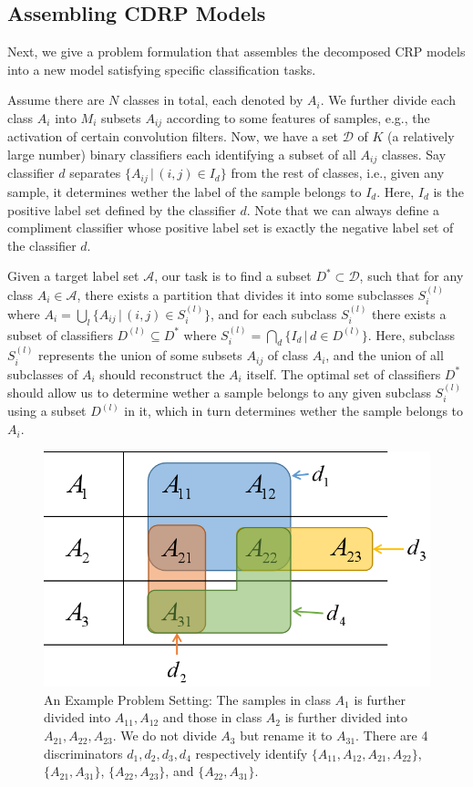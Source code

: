 \documentclass[acmsmall,nonacm]{acmart}\settopmatter{}
\begin{document}
\subsection{Assembling CDRP Models}
Next, we give a problem formulation that assembles the decomposed CRP models into a new model satisfying specific classification tasks.

Assume there are $N$ classes in total, each denoted by $A_i$.
We further divide each class $A_i$ into $M_i$ subsets $A_{ij}$ according to some features of samples, e.g., the activation of certain convolution filters.
Now, we have a set $\mathcal{D}$ of $K$ (a relatively large number) binary classifiers each identifying a subset of all $A_{ij}$ classes.
Say classifier $d$ separates $\{A_{ij} \,|\, (i, j) \in I_d\}$ from the rest of classes, i.e., given any sample, it determines wether the label of the sample belongs to $I_d$.
Here, $I_d$ is the positive label set defined by the classifier $d$.
Note that we can always define a compliment classifier whose positive label set is exactly the negative label set of the classifier $d$.

Given a target label set $\mathcal{A}$, our task is to find a subset $D^* \subset \mathcal{D}$, such that for any class $A_i \in \mathcal{A}$, there exists a partition that divides it into some subclasses $S_i^{(l)}$ where $A_i = \bigcup_l \{A_{ij} \,|\, (i, j) \in S_i^{(l)}\}$, and for each subclass $S_i^{(l)}$ there exists a subset of classifiers $D^{(l)} \subseteq D^*$ where $S_i^{(l)} = \bigcap_d \{I_d \,|\, d \in D^{(l)}\}$.
Here, subclass $S_i^{(l)}$ represents the union of some subsets $A_{ij}$ of class $A_i$, and the union of all subclasses of $A_i$ should reconstruct the $A_i$ itself.
The optimal set of classifiers $D^*$ should allow us to determine wether a sample belongs to any given subclass $S_i^{(l)}$ using a subset $D^{(l)}$ in it, which in turn determines wether the sample belongs to $A_i$.

\begin{figure}[h]
    \centering
    \includegraphics[width=0.45\linewidth]{fig/formulation_example.png}
    \caption{An Example Problem Setting:
    The samples in class $A_1$ is further divided into $A_{11}, A_{12}$ and those in class $A_2$ is further divided into $A_{21}, A_{22}, A_{23}$.
    We do not divide $A_3$ but rename it to $A_{31}$.
    There are 4 discriminators $d_1, d_2, d_3, d_4$ respectively identify $\{A_{11}, A_{12}, A_{21}, A_{22}\}$, $\{A_{21}, A_{31}\}$, $\{A_{22}, A_{23}\}$, and $\{A_{22}, A_{31}\}$.}
    \label{fig:feasible-example}
\end{figure}
\end{document}

